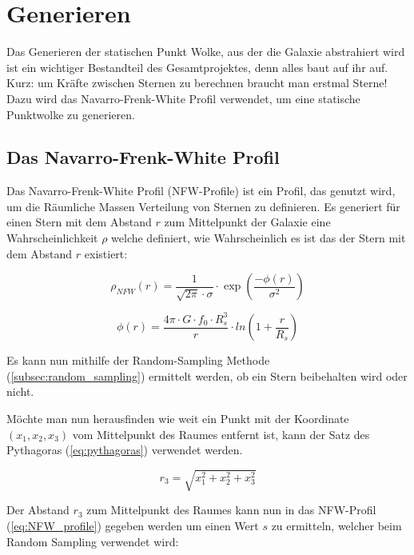 \section{Generieren}

Das Generieren der statischen Punkt Wolke, aus der die Galaxie abstrahiert wird
ist ein wichtiger Bestandteil des Gesamtprojektes, denn alles baut auf ihr auf.
Kurz: um Kräfte zwischen Sternen zu berechnen braucht man erstmal Sterne! Dazu
wird das Navarro-Frenk-White Profil verwendet, um eine statische Punktwolke zu
generieren.

\subsection{Das Navarro-Frenk-White Profil}
Das Navarro-Frenk-White Profil (NFW-Profile) \cite{navarrofrenkwhite95} ist ein Profil, das genutzt wird, um
die Räumliche Massen Verteilung von Sternen zu definieren. Es generiert für
einen Stern mit dem Abstand \( r \) zum Mittelpunkt der Galaxie eine
Wahrscheinlichkeit \( \rho \) welche definiert, wie Wahrscheinlich es ist das der
Stern mit dem Abstand \( r \) existiert:

\begin{equation} \label{eq:NFW_profile}
\rho_{NFW}(r) = \frac{ 1 }{ \sqrt{ 2 \pi } \cdot \sigma } \cdot
\exp \left( \frac{ -\phi(r) }{ \sigma^{ 2 } } \right)
\end{equation}

\begin{equation*}
\phi(r) = \frac{ 4\pi \cdot G \cdot f_{0} \cdot R_{s}^3 }{ r } \cdot
ln{ \left( 1 + \frac{ r }{ R_{s} } \right) }
\end{equation*}

Es kann nun mithilfe der Random-Sampling Methode (\ref{subsec:random_sampling})
ermittelt werden, ob ein Stern beibehalten wird oder nicht.\\

\par Möchte man nun herausfinden wie weit ein Punkt mit der Koordinate \(
(x_{1}, x_{2}, x_{3}) \) vom Mittelpunkt des Raumes entfernt ist, kann der Satz
des Pythagoras (\ref{eq:pythagoras}) verwendet werden.

\begin{equation} \label{eq:pythagoras}
r_{3} = \sqrt{x_{1}^{2} + x_{2}^{2} + x_{3}^{2} }
\end{equation}

Der Abstand \( r_{3} \) zum Mittelpunkt des Raumes kann nun in das NFW-Profil
(\ref{eq:NFW_profile}) gegeben werden um einen Wert \( s \) zu ermitteln, welcher
beim Random Sampling verwendet wird:

